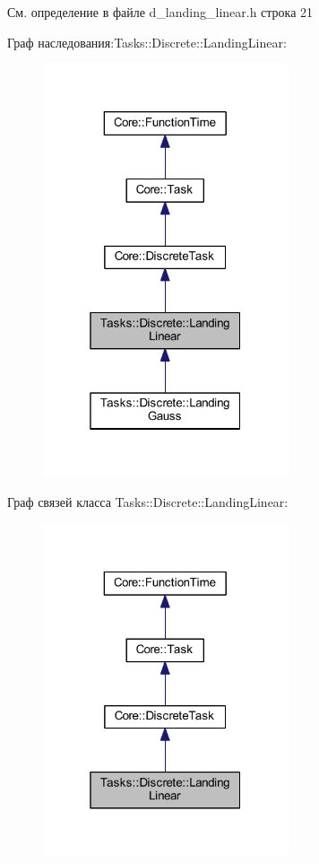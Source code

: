 См. определение в файле d\+\_\+landing\+\_\+linear.\+h строка 21



Граф наследования\+:Tasks\+:\+:Discrete\+:\+:Landing\+Linear\+:\nopagebreak
\begin{figure}[H]
\begin{center}
\leavevmode
\includegraphics[width=205pt]{class_tasks_1_1_discrete_1_1_landing_linear__inherit__graph}
\end{center}
\end{figure}


Граф связей класса Tasks\+:\+:Discrete\+:\+:Landing\+Linear\+:\nopagebreak
\begin{figure}[H]
\begin{center}
\leavevmode
\includegraphics[width=205pt]{class_tasks_1_1_discrete_1_1_landing_linear__coll__graph}
\end{center}
\end{figure}


